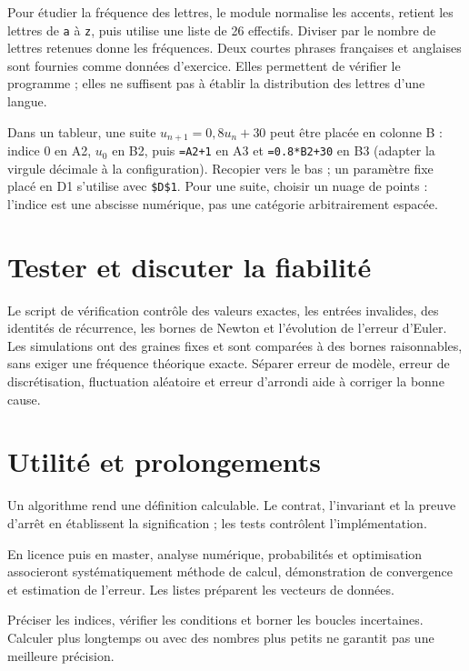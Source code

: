 \documentclass[../cours_1re.tex]{subfiles}
\begin{document}
Pour étudier la fréquence des lettres, le module normalise les accents,
retient les lettres de \texttt{a} à \texttt{z}, puis utilise une liste de
26 effectifs. Diviser par le nombre de lettres retenues donne les fréquences.
Deux courtes phrases françaises et anglaises sont fournies comme données
d'exercice. Elles permettent de vérifier le programme ; elles ne suffisent
pas à établir la distribution des lettres d'une langue.

Dans un tableur, une suite $u_{n+1}=0{,}8u_n+30$ peut être placée en colonne B :
indice $0$ en A2, $u_0$ en B2, puis \texttt{=A2+1} en A3 et
\texttt{=0.8*B2+30} en B3 (adapter la virgule décimale à la configuration).
Recopier vers le bas ; un paramètre fixe placé en D1 s'utilise avec
\texttt{\$D\$1}. Pour une suite, choisir un nuage de points : l'indice
est une abscisse numérique, pas une catégorie arbitrairement espacée.

\begin{finchapitre}
\section{Tester et discuter la fiabilité}
Le script de vérification contrôle des valeurs exactes, les entrées invalides,
des identités de récurrence, les bornes de Newton et l'évolution de l'erreur
d'Euler. Les simulations ont des graines fixes et sont comparées à des bornes
raisonnables, sans exiger une fréquence théorique exacte.
Séparer erreur de modèle, erreur de discrétisation, fluctuation aléatoire
et erreur d'arrondi aide à corriger la bonne cause.


\section{Utilité et prolongements}
Un algorithme rend une définition calculable. Le contrat, l'invariant et
la preuve d'arrêt en établissent la signification ; les tests contrôlent l'implémentation.

En licence puis en master, analyse numérique, probabilités et optimisation
associeront systématiquement méthode de calcul, démonstration de convergence
et estimation de l'erreur. Les listes préparent les vecteurs de données.
\begin{retenir}
Préciser les indices, vérifier les conditions et borner les boucles incertaines.
Calculer plus longtemps ou avec des nombres plus petits ne garantit pas une meilleure précision.
\end{retenir}
\end{finchapitre}
\end{document}
